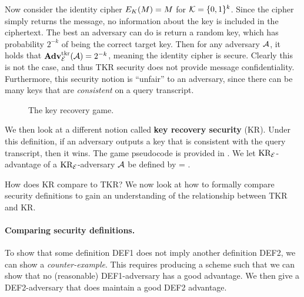 Now consider the identity cipher $E_{K}(M) = M$ for ${\cal K}=\{0,1\}^k$. Since the cipher simply returns the message, no information about the key is included in the ciphertext. The best an adversary can do is return a random key, which has probability $2^{-k}$ of being the correct target key.
Then for any adversary ${\mathcal A}$, it holds that $\mathbf{Adv}^{\mathrm{tkr}}_{{\cal E}}({\mathcal A}) = 2^{-k}$, meaning the identity cipher is secure. Clearly this is not the case, and thus TKR security does not provide message confidentiality. Furthermore, this security notion is ``unfair'' to an adversary, since there can be many keys that are \textit{consistent} on a query transcript. 

\begin{figure}[p]
	\centering
	\caption{The key recovery game.}
	\label{fig:kr}
\end{figure}

We then look at a different notion called \textbf{key recovery security} (KR). Under this definition, if an adversary outputs a key that is consistent with the query transcript, then it wins. The game pseudocode is provided in . We let $\textnormal{KR}_{\cal E}$-advantage of a $\textnormal{KR}_{\cal E}$-adversary ${\mathcal A}$ be defined by 
\bnm
\AdvKR{\cipher}{\advA} = \Prob{\KR^\advA_\cipherE \Rightarrow\true}  \;.
\enm

How does KR compare to TKR? We now look at how to formally compare security definitions to gain an understanding of the relationship between TKR and KR. 

\paragraph{Comparing security definitions.} To show that some definition DEF1 does not imply another definition DEF2, we can show a \textit{counter-example}. This requires producing a scheme such that we can show that no (reasonable) DEF1-adversary has a good advantage. We then give a DEF2-adversary that does maintain a good DEF2 advantage.

